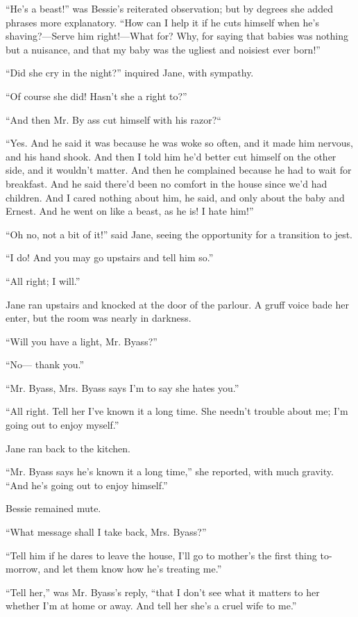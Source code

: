 ``He's a beast!'' was Bessie's reiterated observation; but by degrees
she added phrases more explanatory. ``How can I help it if he cuts
himself when he's shaving?---Serve him right!---What for? Why, for
saying that babies was nothing but a nuisance, and that my baby was the
ugliest and noisiest ever born!''

``Did she cry in the night?'' inquired Jane, with sympathy.

``Of course she did! Hasn't she a right to?''

``And then Mr. By ass cut himself with his razor?``

``Yes. And he said it was because he was woke so often, and it made him
nervous, and his hand shook. And then I told him he'd better cut himself
on the other side, and it wouldn't matter. And then he complained
because he had to wait for breakfast. And {}he said there'd been no
comfort in the house since we'd had children. And I cared nothing about
him, he said, and only about the baby and Ernest. And he went on like a
beast, as he is! I hate him!''

``Oh no, not a bit of it!'' said Jane, seeing the opportunity for a
transition to jest.

``I do! And you may go upstairs and tell him so.''

``All right; I will.''

Jane ran upstairs and knocked at the door of the parlour. A gruff voice
bade her enter, but the room was nearly in darkness.

``Will you have a light, Mr. Byass?''

``No--- thank you.''

``Mr. Byass, Mrs. Byass says I'm to say she hates you.''

``All right. Tell her I've known it a long time. She needn't trouble
about me; I'm going out to enjoy myself.''

Jane ran back to the kitchen.

``Mr. Byass says he's known it a long time,'' she reported, with much
gravity. ``And he's going out to enjoy himself.''

{}Bessie remained mute.

``What message shall I take back, Mrs. Byass?''

``Tell him if he dares to leave the house, I'll go to mother's the first
thing to-morrow, and let them know how he's treating me.''

``Tell her,'' was Mr. Byass's reply, ``that I don't see what it matters
to her whether I'm at home or away. And tell her she's a cruel wife to
me.''

